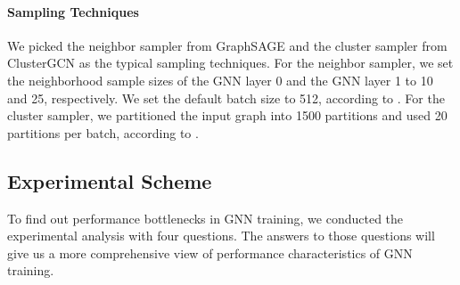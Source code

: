 \paragraph{Sampling Techniques}

We picked the neighbor sampler from GraphSAGE \cite{hamilton2017_graphsage} and the cluster sampler from ClusterGCN \cite{chiang2019_cluster_gcn} as the typical sampling techniques.
%
For the neighbor sampler, we set the neighborhood sample sizes of the GNN layer 0 and the GNN layer 1 to 10 and 25, respectively.
%
We set the default batch size to 512, according to \cite{hamilton2017_graphsage}.
%
For the cluster sampler, we partitioned the input graph into 1500 partitions and used 20 partitions per batch, according to \cite{chiang2019_cluster_gcn}.

\subsection{Experimental Scheme}
\label{sec:experimental_scheme}

To find out performance bottlenecks in GNN training, we conducted the experimental analysis with four questions.
%
The answers to those questions will give us a more comprehensive view of performance characteristics of GNN training.

